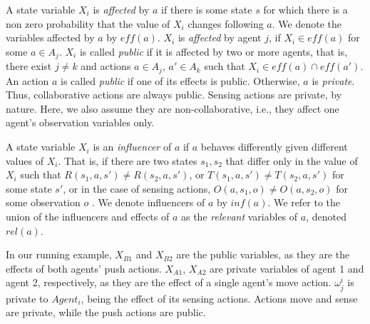 \documentclass[runningheads]{llncs}
\newcommand{\eliran}[1]{\textbf{[\color{red}ELIRAN:#1]}}
\newcommand{\ronen}[1]{\textbf{[\color{blue}RONEN:#1]}}
\newcommand{\guy}[1]{\textbf{[\color{red}GUY:#1]}}
\newcommand{\eff}{\mathit{eff}}
\newcommand{\rel}{\mathit{rel}}
\newcommand{\infl}{\mathit{inf}}
\begin{document}
A state variable $X_i$ is {\em affected} by $a$ if there is some state $s$ for which there is a non zero probability that the value of $X_i$ changes following $a$. We denote the variables affected by $a$ by $\eff(a)$. $X_i$ is \emph{affected} by agent $j$, if  $X_i\in\eff(a)$ for some  $a\in A_j$.
$X_i$ is called \emph{public} if it is affected by two or more agents, that is, there exist $j\neq k$ and actions $a\in A_j$, $a'\in A_k$ such that $X_i\in \eff(a) \cap \eff(a')$.
An action $a$ is called \emph{public} if one of its effects is public. Otherwise, $a$ is {\em private}.
Thus, collaborative actions are always public. Sensing actions  are private, by nature. Here, we also assume they are non-collaborative, i.e., they affect one agent's observation variables only.

A state variable $X_i$ is an
{\em influencer} of $a$ if $a$ behaves differently given different values of $X_i$.
That is, if there are two states $s_1,s_2$ that differ only in the value of $X_i$ such that $R(s_1,a,s')\neq R(s_2,a,s')$, or $T(s_1,a,s')\neq T(s_2,a,s')$ for some state $s'$, or in the case of sensing actions, $O(a,s_1,o)\neq O(a,s_2,o)$ for some observation $o$ .
We denote influencers of $a$ by $\infl(a)$.
%
We refer to the union of the influencers and effects of $a$ as
the {\em relevant} variables of $a$,
denoted $\rel(a)$. 


\begin{example}
In our running example, $X_{B1}$ and $X_{B2}$ are the public variables, as they are the effects of both agents' push actions.
$X_{A1}$, $X_{A2}$ are private variables of agent 1 and agent 2, respectively, as they are the effect of a single agent's move action.
$\omega^i_j$ is private to
$Agent_i$, being the effect of its sensing actions.
Actions move and sense are private, while the push actions are public.
\end{example}
\end{document}
